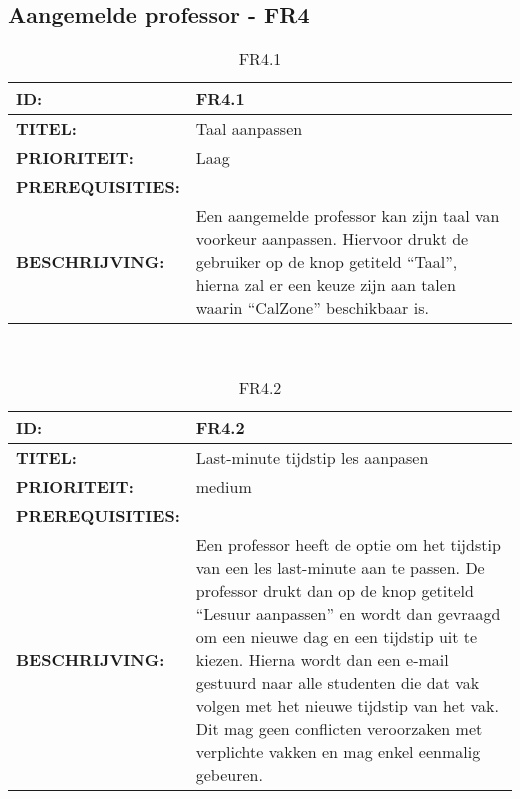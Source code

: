 \subsection{Aangemelde professor - FR4}

\noindent\begin{table}[h]
            \begin{tabular}{l | p{10cm}}
                \textbf{ID:} & FR4.1 \\ \hline
                \textbf{TITEL:} & Taal aanpassen\\ \hline
                \textbf{PRIORITEIT:} &  Laag \\ \hline
                \textbf{PREREQUISITIES:} & \\ \hline
                \textbf{BESCHRIJVING:} & Een aangemelde professor kan zijn taal van voorkeur aanpassen. 
                                        Hiervoor drukt de gebruiker op de knop getiteld “Taal”, hierna zal er een keuze zijn aan talen waarin “CalZone” beschikbaar is.\\ 
            \end{tabular}\\
            \caption{FR4.1}
            \label{tab:myfifteenthtable}
        \end{table}
        
\noindent\begin{table}[h]
            \begin{tabular}{l | p{10cm}}
                \textbf{ID:} & FR4.2 \\ \hline
                \textbf{TITEL:} & Last-minute tijdstip les aanpasen\\ \hline
                \textbf{PRIORITEIT:} &  medium \\ \hline
                \textbf{PREREQUISITIES:} & \\ \hline
                \textbf{BESCHRIJVING:} & Een professor heeft de optie om het tijdstip van een les last-minute aan te passen. De professor drukt dan op de knop getiteld “Lesuur aanpassen” en wordt dan gevraagd om een nieuwe dag en een tijdstip uit te kiezen. Hierna wordt dan een e-mail gestuurd naar alle studenten die dat vak volgen met het nieuwe tijdstip van het vak. Dit mag geen conflicten veroorzaken met verplichte vakken en mag enkel eenmalig gebeuren. \\ 
            \end{tabular}\\
            \caption{FR4.2}
            \label{tab:myeighteenthtable}
        \end{table}
        
